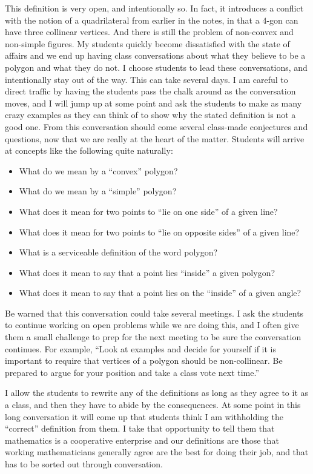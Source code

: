 \documentclass{tufte-handout}
\theoremstyle{definition}
\begin{document}
This definition is very open, and intentionally so. In fact, it introduces a conflict with the notion of a quadrilateral from earlier in the notes, in that a $4$-gon can have three collinear vertices. And there is still the problem of non-convex and non-simple figures. My students quickly become dissatisfied with the state of affairs and we end up having class conversations about what they believe to be a polygon and what they do not. I choose students to lead these conversations, and intentionally stay out of the way. This can take several days. I am careful to direct traffic by having the students pass the chalk around as the conversation moves, and I will jump up at some point and ask the students to make as many crazy examples as they can think of to show why the stated definition is not a good one. From this conversation should come several class-made conjectures and questions, now that we are really at the heart of the matter. Students will arrive at concepts like the following quite naturally:\begin{itemize}
\item What do we mean by a ``convex'' polygon?
\item What do we mean by a ``simple'' polygon?
\item What does it mean for two points to ``lie on one side'' of a
given line?
\item What does it mean for two points to ``lie on opposite sides'' of a given line?
\item What is a serviceable definition of the word polygon?
\item What does it mean to say that a point lies ``inside'' a given polygon?
\item What does it mean to say that a point lies on the ``inside'' of a given angle?
\end{itemize}
Be warned that this conversation could take several meetings. I ask the students to continue working on open problems while we are doing this, and I often give them a small challenge to prep for the next meeting to be sure the conversation continues. For example, ``Look at examples and decide for yourself if it is important to require that vertices of a polygon should be non-collinear. Be prepared to argue for your position and take a class vote next time.''

I allow the students to rewrite any of the definitions as long as they agree to it as a class, and then they have to abide by the consequences. At some point in this long conversation it will come up that students think I am withholding the ``correct'' definition from them. I take that opportunity to tell them that mathematics is a cooperative enterprise and our definitions are those that working mathematicians generally agree are the best for doing their job, and that has to be sorted out through conversation. 
\end{document}

